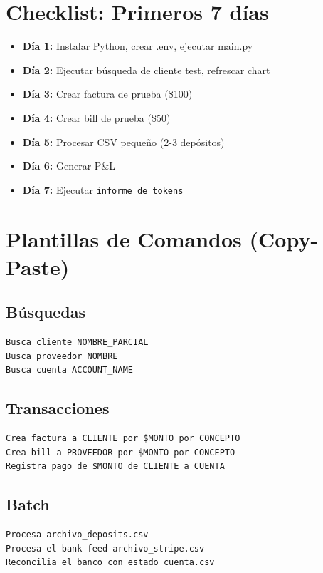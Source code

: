\documentclass[12pt,oneside]{article}
\begin{document}
\newpage

\appendix

\section{Checklist: Primeros 7 días}

\begin{itemize}
    \item [ ] \textbf{Día 1:} Instalar Python, crear .env, ejecutar main.py
    \item [ ] \textbf{Día 2:} Ejecutar búsqueda de cliente test, refrescar chart
    \item [ ] \textbf{Día 3:} Crear factura de prueba (\$100)
    \item [ ] \textbf{Día 4:} Crear bill de prueba (\$50)
    \item [ ] \textbf{Día 5:} Procesar CSV pequeño (2-3 depósitos)
    \item [ ] \textbf{Día 6:} Generar P\&L
    \item [ ] \textbf{Día 7:} Ejecutar \texttt{informe de tokens}
\end{itemize}

\section{Plantillas de Comandos (Copy-Paste)}

\subsection{Búsquedas}
\begin{verbatim}
Busca cliente NOMBRE_PARCIAL
Busca proveedor NOMBRE
Busca cuenta ACCOUNT_NAME
\end{verbatim}

\subsection{Transacciones}
\begin{verbatim}
Crea factura a CLIENTE por $MONTO por CONCEPTO
Crea bill a PROVEEDOR por $MONTO por CONCEPTO
Registra pago de $MONTO de CLIENTE a CUENTA
\end{verbatim}

\subsection{Batch}
\begin{verbatim}
Procesa archivo_deposits.csv
Procesa el bank feed archivo_stripe.csv
Reconcilia el banco con estado_cuenta.csv
\end{verbatim}
\end{document}
